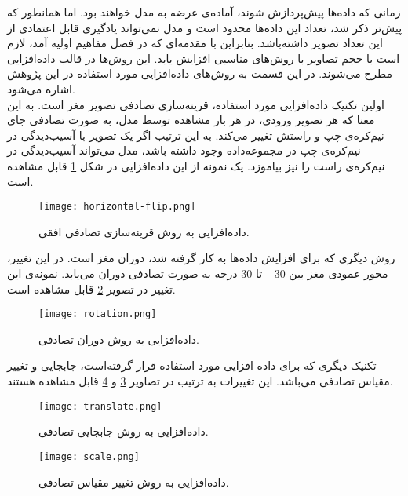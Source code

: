 
زمانی که داده‌ها پیش‌پردازش شوند، آماده‌ی عرضه به مدل خواهند بود.
اما همانطور که پیش‌تر ذکر شد، تعداد این داده‌ها محدود است و مدل نمی‌تواند یادگیری قابل اعتمادی از این تعداد تصویر داشته‌باشد.
بنابراین
 با مقدمه‌ای که در فصل مفاهیم اولیه آمد، لازم است با حجم تصاویر با روش‌های مناسبی افزایش یابد.
 این روش‌ها در قالب داده‌افزایی مطرح می‌شوند.
 در این قسمت به روش‌های داده‌افزایی مورد استفاده در این پژوهش اشاره می‌شود.\\

 اولین تکنیک داده‌افزایی مورد استفاده، قرینه‌سازی تصادفی تصویر مغز است.
 به این معنا که هر تصویر ورودی، در هر بار مشاهده توسط مدل، به صورت تصادفی
 جای نیم‌کره‌ی چپ و راستش تغییر می‌کند.
 به این ترتیب اگر یک تصویر با آسیب‌دیدگی در نیم‌کره‌ی چپ در مجموعه‌داده وجود داشته باشد، مدل می‌تواند آسیب‌دیدگی در نیم‌کره‌ی راست را نیز بیاموزد.
 یک نمونه از این داده‌افزایی در شکل \ref{fig:horizontal-flip} قابل مشاهده است.

 \begin{figure}[ht]
\centering
\texttt{[image: horizontal-flip.png]}
\caption[]{داده‌افزایی به روش قرینه‌سازی تصادفی افقی.}
\label{fig:horizontal-flip}
\end{figure}

روش دیگری که برای افزایش داده‌ها به کار گرفته شد، دوران مغز است. در این 
تغییر، محور عمودی مغز بین $-30$ تا $30$ درجه به صورت تصادفی دوران می‌یابد.
نمونه‌ی این تغییر در تصویر \ref{fig:rotation}
قابل مشاهده است.

\begin{figure}[ht]
\centering
\texttt{[image: rotation.png]}
\caption[]{داده‌افزایی به روش دوران تصادفی.}
\label{fig:rotation}
\end{figure}

تکنیک دیگری که برای داده افزایی مورد استفاده قرار گرفته‌است، جابجایی و تغییر مقیاس تصادفی می‌باشد.
این تغییرات به ترتیب در تصاویر \ref{fig:translate} و \ref{fig:scale} قابل مشاهده هستند.

\begin{figure}[ht]
\centering
\texttt{[image: translate.png]}
\caption[]{داده‌افزایی به روش جابجایی تصادفی.}
\label{fig:translate}
\end{figure}

\begin{figure}[ht]
\centering
\texttt{[image: scale.png]}
\caption[]{داده‌افزایی به روش تغییر مقیاس تصادفی.}
\label{fig:scale}
\end{figure}

